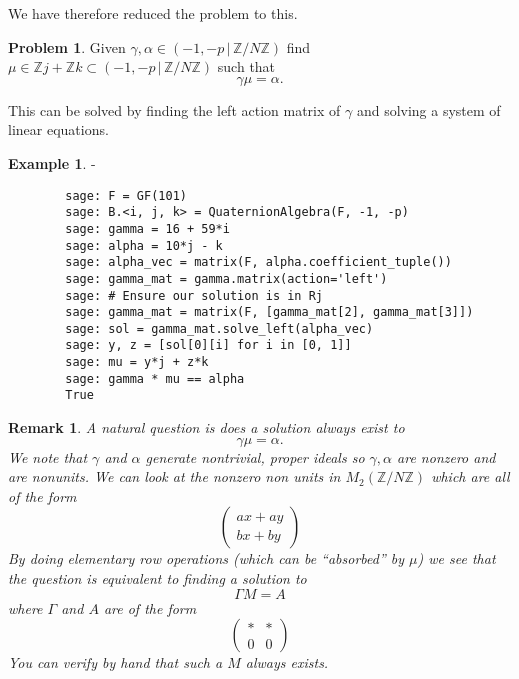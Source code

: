 \documentclass[10pt]{article}
\theoremstyle{plain}
\newtheorem{remark}[theorem]{Remark}
\theoremstyle{definition}
\newtheorem{example}[theorem]{Example}
\newtheorem{prob}[theorem]{Problem}
\newcommand{\Z}{\mathbb{Z}}
\begin{document}
We have therefore reduced the problem to this.

\begin{prob}
    Given \( \gamma, \alpha \in (-1, -p \, | \, \Z / N\Z) \) find \( \mu \in \Z j + \Z k \subset (-1, -p \, | \, \Z / N\Z) \) such that
    \[
        \gamma \mu = \alpha .
    \]
\end{prob}

This can be solved by finding the left action matrix of \( \gamma \) and solving a system of linear equations.

\begin{example}
    -
    \begin{lstlisting}
        sage: F = GF(101)
        sage: B.<i, j, k> = QuaternionAlgebra(F, -1, -p)
        sage: gamma = 16 + 59*i
        sage: alpha = 10*j - k
        sage: alpha_vec = matrix(F, alpha.coefficient_tuple())
        sage: gamma_mat = gamma.matrix(action='left')
        sage: # Ensure our solution is in Rj
        sage: gamma_mat = matrix(F, [gamma_mat[2], gamma_mat[3]])
        sage: sol = gamma_mat.solve_left(alpha_vec)
        sage: y, z = [sol[0][i] for i in [0, 1]]
        sage: mu = y*j + z*k
        sage: gamma * mu == alpha
        True
    \end{lstlisting}
\end{example}

\begin{remark}
    A natural question is does a solution always exist to
    \[
        \gamma \mu = \alpha .
    \]
    We note that \( \gamma \) and \( \alpha \) generate nontrivial, proper ideals so \( \gamma, \alpha \) are nonzero and are nonunits.
    We can look at the nonzero non units in \( M_2(\Z / N\Z) \) which are all of the form
    \[
        \begin{pmatrix}
            ax + ay \\
            bx + by
        \end{pmatrix}
    \]
    By doing elementary row operations (which can be ``absorbed'' by \( \mu \)) we see that the question is equivalent to finding a solution to
    \[
        \Gamma M = A
    \]
    where \( \Gamma \) and \( A \) are of the form
    \[
        \begin{pmatrix}
            * & * \\
            0 & 0
        \end{pmatrix}
    \]
    You can verify by hand that such a \( M \) always exists.
\end{remark}
\end{document}
